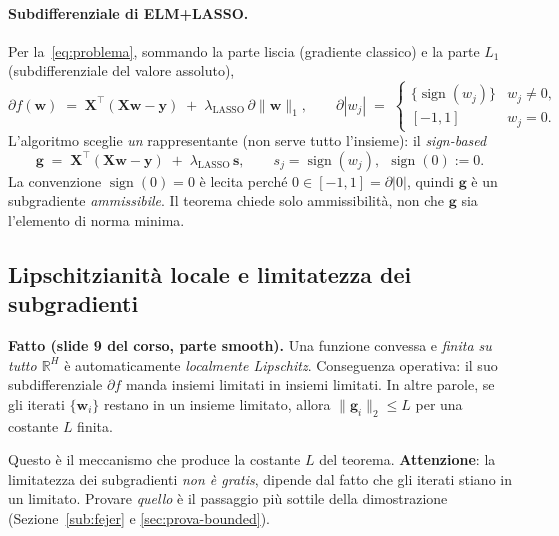 \documentclass[11pt,a4paper]{article}
\theoremstyle{definition}
\newcommand{\w}{\bm{w}}
\newcommand{\X}{\bm{X}}
\newcommand{\y}{\bm{y}}
\newcommand{\g}{\bm{g}}
\newcommand{\svec}{\bm{s}}
\newcommand{\sign}{\operatorname{sign}}
\newcommand{\norm}[1]{\lVert #1\rVert}
\newcommand{\R}{\mathbb{R}}
\newcommand{\lasso}{\lambda_{\mathrm{LASSO}}}
\begin{document}
\paragraph{Subdifferenziale di ELM+LASSO.} Per la~\eqref{eq:problema}, sommando la parte
liscia (gradiente classico) e la parte $L_1$ (subdifferenziale del valore assoluto),
\begin{equation}\label{eq:subdiff-lasso}
\partial f(\w) \;=\; \X^\top(\X\w-\y) \;+\; \lasso\,\partial\norm{\w}_1,
\qquad
\partial|w_j| \;=\;\begin{cases} \{\sign(w_j)\} & w_j\ne 0,\\ [-1,1] & w_j=0.\end{cases}
\end{equation}
L'algoritmo sceglie \emph{un} rappresentante (non serve tutto l'insieme): il
\emph{sign-based}
\begin{equation}\label{eq:scelta-g}
\g \;=\; \X^\top(\X\w-\y) \;+\; \lasso\,\svec,\qquad s_j=\sign(w_j),\ \ \sign(0):=0 .
\end{equation}
La convenzione $\sign(0)=0$ è lecita perché $0\in[-1,1]=\partial|0|$, quindi $\g$ è un
subgradiente \emph{ammissibile}. Il teorema chiede solo ammissibilità, non che $\g$ sia
l'elemento di norma minima.

\subsection{Lipschitzianità locale e limitatezza dei subgradienti}
\label{sub:lipschitz}

\begin{keybox}
\textbf{Fatto (slide 9 del corso, parte smooth).} Una funzione convessa e \emph{finita su
tutto $\R^H$} è automaticamente \emph{localmente Lipschitz}. Conseguenza operativa: il suo
subdifferenziale $\partial f$ manda insiemi limitati in insiemi limitati. In altre parole, se
gli iterati $\{\w_i\}$ restano in un insieme limitato, allora $\norm{\g_i}_2\le L$ per una
costante $L$ finita.
\end{keybox}

Questo è il meccanismo che produce la costante $L$ del teorema. \textbf{Attenzione}: la
limitatezza dei subgradienti \emph{non è gratis}, dipende dal fatto che gli iterati stiano in
un limitato. Provare \emph{quello} è il passaggio più sottile della dimostrazione
(Sezione~\ref{sub:fejer} e \ref{sec:prova-bounded}).

\end{document}
